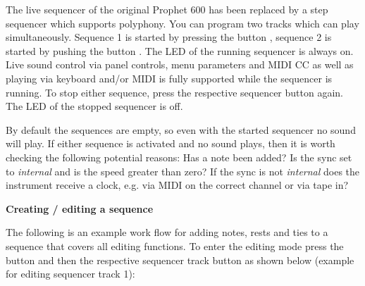 The live sequencer of the original Prophet 600 has been replaced by a step sequencer which supports polyphony. You can program two tracks which can play simultaneously. Sequence 1 is started by pressing the button \seqone, sequence 2 is started by pushing the button \seqtwo. The LED of the running sequencer is always on. Live sound control via panel controls, menu parameters and MIDI CC as well as playing via keyboard and/or MIDI is fully supported while the sequencer is running. To stop either sequence, press the respective sequencer button again. The LED of the stopped sequencer is off. 

By default the sequences are empty, so even with the started sequencer no sound will play. If either sequence is activated and no sound plays, then it is worth checking the following potential reasons: Has a note been added? Is the sync set to \textit{internal} and is the speed greater than zero? If the sync is not \textit{internal} does the instrument receive a clock, e.g. via MIDI on the correct channel or via tape in?

\textbf{Creating / editing a sequence}

The following is an example work flow for adding notes, rests and ties to a sequence that covers all editing functions. To enter the editing mode press the \record button and then the respective sequencer track button as shown below (example for editing sequencer track 1):

\begin{center}
  
\end{center}

